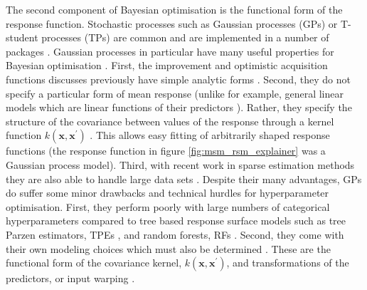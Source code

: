 The second component of Bayesian optimisation is the functional form of the response function. Stochastic processes such as Gaussian processes (GPs) or T-student processes (TPs) \cite{rasmussenGaussianProcessesMachine2006} are common and are implemented in a number of packages \cite{martinez-cantinBayesOptBayesianOptimization2014,NIPS2012_4522,gpyopt2016,JMLR:v21:18-223,mcgibbonOspreyHyperparameterOptimization2016,liuAuptimizerExtensibleOpenSource2019}. Gaussian processes in particular have many useful properties for Bayesian optimisation \cite{feurer2019hyperparameter,brochuTutorialBayesianOptimization2010,jonesEfficientGlobalOptimization1998}.  First, the improvement and optimistic acquisition functions discusses previously have simple analytic forms \cite{brochuTutorialBayesianOptimization2010}. Second, they do not specify a particular form of mean response (unlike for example, general linear models which are linear functions of their predictors \cite{dobson2018introduction}). Rather, they specify the structure of the covariance between values of the response through a kernel function $k(\mathbf{x}, \mathbf{x}^{\prime})$ \cite{rasmussenGaussianProcessesMachine2006}. This allows easy fitting of arbitrarily shaped response functions (the response function in figure \ref{fig:msm_rsm_explainer} was a Gaussian process model).  Third, with recent work in sparse estimation methods they are also able to handle large data sets \cite{quinonero-candelaUnifyingViewSparse2005}. Despite their many advantages, GPs do suffer some minor drawbacks and technical hurdles for hyperparameter optimisation. First, they perform poorly with large numbers of categorical hyperparameters \cite{eggensperger2013towards} compared to tree based response surface models such as tree Parzen estimators, TPEs \cite{bergstraAlgorithmsHyperParameterOptimizationa}, and random forests, RFs \cite{hutterSequentialModelbasedOptimization2011,breiman2001}.  Second, they come with their own modeling choices which must also be determined \cite{rasmussenGaussianProcessesMachine2006}.  These are the functional form of the covariance kernel, $k(\mathbf{x}, \mathbf{x}^{\prime})$, and transformations of the predictors, or input warping \cite{snoekInputWarpingBayesian2014a}. 

